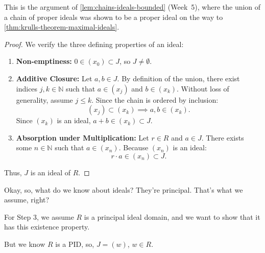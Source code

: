 \begin{proofWrapper}
\begin{content}

This is the argument of \cref{lem:chains-ideals-bounded} (Week~5), where the union of a chain of proper ideals was shown to be a proper ideal on the way to \cref{thm:krulls-theorem-maximal-ideals}.

\begin{proof}
We verify the three defining properties of an ideal:
\begin{enumerate}[label=\textbf{(\arabic*)}]
    \item \textbf{Non-emptiness:} $0 \in (x_0) \subset J$, so $J \neq \emptyset$.
    \item \textbf{Additive Closure:} Let $a, b \in J$. By definition of the union, there exist indices $j, k \in \mathbb{N}$ such that $a \in (x_j)$ and $b \in (x_k)$. Without loss of generality, assume $j \le k$. Since the chain is ordered by inclusion:
    \[
    (x_j) \subset (x_k) \implies a, b \in (x_k).
    \]
    Since $(x_k)$ is an ideal, $a + b \in (x_k) \subset J$.
    \item \textbf{Absorption under Multiplication:} Let $r \in R$ and $a \in J$. There exists some $n \in \mathbb{N}$ such that $a \in (x_n)$. Because $(x_n)$ is an ideal:
    \[
    r \cdot a \in (x_n) \subset J.
    \]
\end{enumerate}
Thus, $J$ is an ideal of $R$.
\end{proof}
\end{content}

\begin{hidden}
\end{hidden}

\begin{speech}[01:12:09 - 01:15:35]
Okay, so, what do we know about ideals? They're principal. That's what we assume, right?

For Step 3, we assume $R$ is a principal ideal domain, and we want to show that it has this existence property.

But we know $R$ is a PID, so, $J = (w)$, $w \in R$. 


\end{speech}
\end{proofWrapper}
